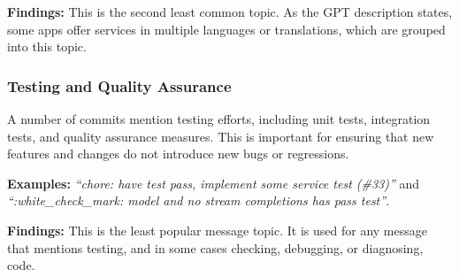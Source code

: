 \textbf{Findings: } This is the second least common topic. As the GPT description states, some apps offer services in multiple languages or translations, which are grouped into this topic.

\subsubsection{Testing and Quality Assurance}
A number of commits mention testing efforts, including unit tests, integration tests, and quality assurance measures. This is important for ensuring that new features and changes do not introduce new bugs or regressions.

\textbf{Examples: } \textit{``chore: have test pass, implement some service test (\#33)''} and \textit{``:white\_check\_mark: model and no stream completions has pass test''}.

\textbf{Findings: } This is the least popular message topic. It is used for any message that mentions testing, and in some cases checking, debugging, or diagnosing, code.